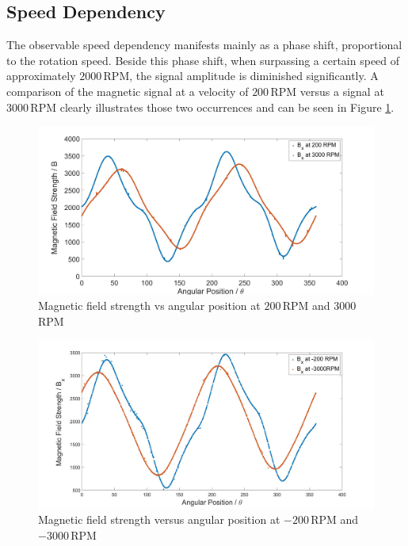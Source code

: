 \documentclass[english]{isasthesis}
\begin{document}
    		\subsection{Speed Dependency} \label{speed dependency}
    		The observable speed dependency manifests mainly as a phase shift, proportional to the rotation speed. Beside this phase shift, when surpassing a certain speed of approximately $2000\,$RPM, the signal amplitude is diminished significantly. A comparison of the magnetic signal at a velocity of $200\,$RPM versus a signal at $3000\,$RPM clearly illustrates those two occurrences and can be seen in Figure \ref{fig:200RPM vs 3000RPM}.
    		\begin{figure}[t]
    		\begin{center}
    			\includegraphics[width=1\textwidth]{figures/phaseshift_200_3000.jpg}   		
  			\end{center}
    		\caption{Magnetic field strength vs angular position at $200\,$RPM and $3000\,$RPM}
    		\label{fig:200RPM vs 3000RPM}
    		\end{figure}
    		\begin{figure}[t]
    		\begin{center}
    			\includegraphics[width=1\textwidth]{figures/phaseshift_neg_200_3000.jpg}   		
  			\end{center}
    		\caption{Magnetic field strength versus angular position at $-200\,$RPM and $-3000\,$RPM}
    		\label{fig:neg 200RPM vs 3000RPM}
    		\end{figure}
\end{document}
